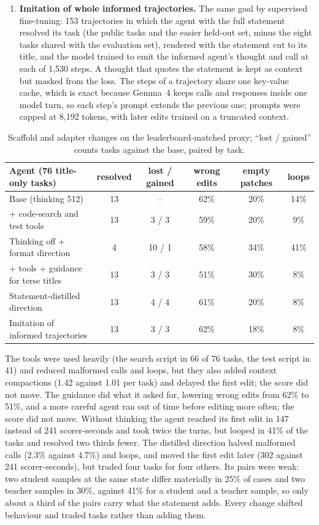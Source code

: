 \documentclass[11pt]{article}
\begin{document}
\begin{enumerate}
  \item \textbf{Imitation of whole informed trajectories.} The same goal by supervised fine-tuning: 153 trajectories in which the agent with the full statement resolved its task (the public tasks and the easier held-out set, minus the eight tasks shared with the evaluation set), rendered with the statement cut to its title, and the model trained to emit the informed agent's thought and call at each of 1,530 steps. A thought that quotes the statement is kept as context but masked from the loss. The steps of a trajectory share one key-value cache, which is exact because Gemma~4 keeps calls and responses inside one model turn, so each step's prompt extends the previous one; prompts were capped at 8,192 tokens, with later edits trained on a truncated context.
\end{enumerate}

\begin{table}[t]
\centering
\small
\begin{tabularx}{\linewidth}{Lccccc}
\toprule
Agent (76 title-only tasks) & resolved & lost / gained & wrong edits & empty patches & loops \\
\midrule
Base (thinking 512) & 13 & -- & 62\% & 20\% & 14\% \\
+ code-search and test tools & 13 & 3 / 3 & 59\% & 20\% & 9\% \\
Thinking off + format direction & 4 & 10 / 1 & 58\% & 34\% & 41\% \\
+ tools + guidance for terse titles & 13 & 3 / 3 & 51\% & 30\% & 8\% \\
Statement-distilled direction & 13 & 4 / 4 & 61\% & 20\% & 8\% \\
Imitation of informed trajectories & 13 & 3 / 3 & 62\% & 18\% & 8\% \\
\bottomrule
\end{tabularx}
\caption{Scaffold and adapter changes on the leaderboard-matched proxy; ``lost / gained'' counts tasks against the base, paired by task.}
\label{tab:scaffold}
\end{table}

The tools were used heavily (the search script in 66 of 76 tasks, the test script in 41) and reduced malformed calls and loops, but they also added context compactions (1.42 against 1.01 per task) and delayed the first edit; the score did not move. The guidance did what it asked for, lowering wrong edits from 62\% to 51\%, and a more careful agent ran out of time before editing more often; the score did not move. Without thinking the agent reached its first edit in 147 instead of 241 scorer-seconds and took twice the turns, but looped in 41\% of the tasks and resolved two thirds fewer. The distilled direction halved malformed calls (2.3\% against 4.7\%) and loops, and moved the first edit later (302 against 241 scorer-seconds), but traded four tasks for four others. Its pairs were weak: two student samples at the same state differ materially in 25\% of cases and two teacher samples in 30\%, against 41\% for a student and a teacher sample, so only about a third of the pairs carry what the statement adds. Every change shifted behaviour and traded tasks rather than adding them.
\end{document}
